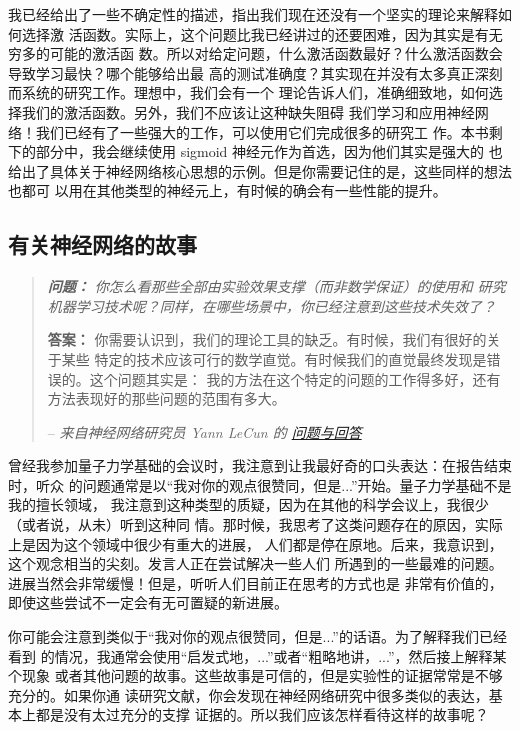 我已经给出了一些不确定性的描述，指出我们现在还没有一个坚实的理论来解释如何选择激
活函数。实际上，这个问题比我已经讲过的还要困难，因为其实是有无穷多的可能的激活函
数。所以对给定问题，什么激活函数最好？什么激活函数会导致学习最快？哪个能够给出最
高的测试准确度？其实现在并没有太多真正深刻而系统的研究工作。理想中，我们会有一个
理论告诉人们，准确细致地，如何选择我们的激活函数。另外，我们不应该让这种缺失阻碍
我们学习和应用神经网络！我们已经有了一些强大的工作，可以使用它们完成很多的研究工
作。本书剩下的部分中，我会继续使用 sigmoid 神经元作为首选，因为他们其实是强大的
也给出了具体关于神经网络核心思想的示例。但是你需要记住的是，这些同样的想法也都可
以用在其他类型的神经元上，有时候的确会有一些性能的提升。

\subsection{有关神经网络的故事}

\begin{quote}
{\itshape \textbf{问题：} 你怎么看那些全部由实验效果支撑（而非数学保证）的使用和
  研究机器学习技术呢？同样，在哪些场景中，你已经注意到这些技术失效了？}

\textbf{答案：} 你需要认识到，我们的理论工具的缺乏。有时候，我们有很好的关于某些
特定的技术应该可行的数学直觉。有时候我们的直觉最终发现是错误的。这个问题其实是：
我的方法在这个特定的问题的工作得多好，还有方法表现好的那些问题的范围有多大。

-- {\itshape 来自神经网络研究员 Yann LeCun 的%
  \href{http://www.reddit.com/r/MachineLearning/comments/25lnbt/ama_yann_lecun/chivdv7}{
    问题与回答}}
\end{quote}

曾经我参加量子力学基础的会议时，我注意到让我最好奇的口头表达：在报告结束时，听众
的问题通常是以“我对你的观点很赞同，但是...”开始。量子力学基础不是我的擅长领域，
我注意到这种类型的质疑，因为在其他的科学会议上，我很少（或者说，从未）听到这种同
情。那时候，我思考了这类问题存在的原因，实际上是因为这个领域中很少有重大的进展，
人们都是停在原地。后来，我意识到，这个观念相当的尖刻。发言人正在尝试解决一些人们
所遇到的一些最难的问题。进展当然会非常缓慢！但是，听听人们目前正在思考的方式也是
非常有价值的，即使这些尝试不一定会有无可置疑的新进展。

你可能会注意到类似于“我对你的观点很赞同，但是...”的话语。为了解释我们已经看到
的情况，我通常会使用“启发式地，...”或者“粗略地讲，...”，然后接上解释某个现象
或者其他问题的故事。这些故事是可信的，但是实验性的证据常常是不够充分的。如果你通
读研究文献，你会发现在神经网络研究中很多类似的表达，基本上都是没有太过充分的支撑
证据的。所以我们应该怎样看待这样的故事呢？

